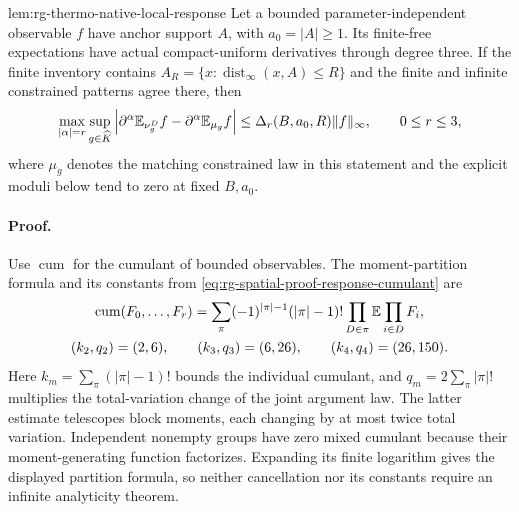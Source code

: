{lem:rg-thermo-native-local-response}
Let a bounded parameter-independent observable \(f\) have anchor support
\(A\), with \(a_0=|A|\ge1\). Its finite-free expectations have actual
compact-uniform derivatives through degree three. If the finite inventory
contains \(A_R=\{x:\operatorname{dist}_\infty(x,A)\le R\}\) and the
finite and infinite constrained patterns agree there, then
\begin{equation}
 \max_{|\alpha|=r}\sup_{g\in\widehat K}
 \left|\partial^\alpha\mathbb E_{\nu^D_g}f-
       \partial^\alpha\mathbb E_{\mu_g}f\right|
 \le\Delta_r(B,a_0,R)\|f\|_\infty,\qquad 0\le r\le3,
 \label{eq:rg-thermo-native-local-response-limit}
\end{equation}
where \(\mu_g\) denotes the matching constrained law in this statement
and the explicit moduli below tend to zero at fixed \(B,a_0\).\thermoestablishedstatus


\paragraph{Proof.}
Use \(\operatorname{cum}\) for the cumulant of bounded observables. The
moment-partition formula and its constants from
\cref{eq:rg-spatial-proof-response-cumulant} are
\begin{equation}
 \begin{gathered}
 \operatorname{cum}(F_0,\ldots,F_r)
 =\sum_{\pi}(-1)^{|\pi|-1}(|\pi|-1)!
                  \prod_{D\in\pi}\mathbb E\prod_{i\in D}F_i,\\
 (k_2,q_2)=(2,6),\qquad (k_3,q_3)=(6,26),\qquad
 (k_4,q_4)=(26,150).
 \end{gathered}
 \label{eq:rg-thermo-native-cumulant-partitions}
\end{equation}
Here \(k_m=\sum_\pi(|\pi|-1)!\) bounds the individual cumulant, and
\(q_m=2\sum_\pi|\pi|!\) multiplies the total-variation change of the
joint argument law. The latter estimate telescopes block moments, each
changing by at most twice total variation. Independent nonempty groups
have zero mixed cumulant because their moment-generating function
factorizes. Expanding its finite logarithm gives the displayed partition
formula, so neither cancellation nor its constants require an infinite
analyticity theorem.

